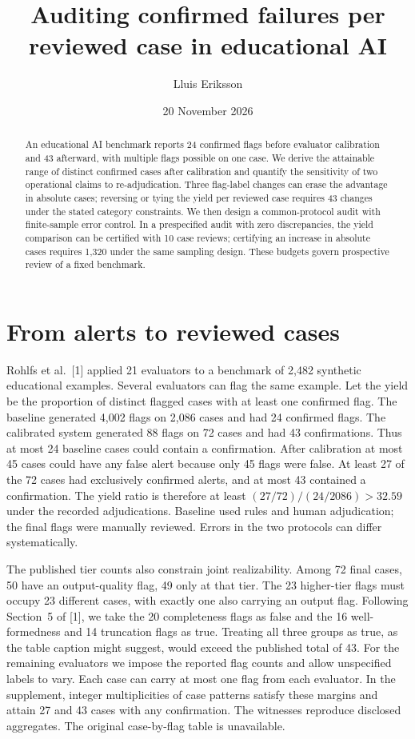 \documentclass[11pt]{article}
\title{Auditing confirmed failures per reviewed case in educational AI}
\author{Lluis Eriksson}\date{20 November 2026}
\begin{document}
\maketitle
\begin{abstract}
An educational AI benchmark reports 24 confirmed flags before evaluator calibration and 43 afterward, with multiple flags possible on one case. We derive the attainable range of distinct confirmed cases after calibration and quantify the sensitivity of two operational claims to re-adjudication. Three flag-label changes can erase the advantage in absolute cases; reversing or tying the yield per reviewed case requires 43 changes under the stated category constraints. We then design a common-protocol audit with finite-sample error control. In a prespecified audit with zero discrepancies, the yield comparison can be certified with 10 case reviews; certifying an increase in absolute cases requires 1,320 under the same sampling design. These budgets govern prospective review of a fixed benchmark.
\end{abstract}
\section{From alerts to reviewed cases}
Rohlfs et al.\ [1] applied 21 evaluators to a benchmark of 2,482 synthetic educational examples. Several evaluators can flag the same example. Let the yield be the proportion of distinct flagged cases with at least one confirmed flag. The baseline generated 4,002 flags on 2,086 cases and had 24 confirmed flags. The calibrated system generated 88 flags on 72 cases and had 43 confirmations. Thus at most 24 baseline cases could contain a confirmation. After calibration at most 45 cases could have any false alert because only 45 flags were false. At least 27 of the 72 cases had exclusively confirmed alerts, and at most 43 contained a confirmation. The yield ratio is therefore at least $(27/72)/(24/2086)>32.59$ under the recorded adjudications. Baseline used rules and human adjudication; the final flags were manually reviewed. Errors in the two protocols can differ systematically.

The published tier counts also constrain joint realizability. Among 72 final cases, 50 have an output-quality flag, 49 only at that tier. The 23 higher-tier flags must occupy 23 different cases, with exactly one also carrying an output flag. Following Section~5 of [1], we take the 20 completeness flags as false and the 16 well-formedness and 14 truncation flags as true. Treating all three groups as true, as the table caption might suggest, would exceed the published total of 43. For the remaining evaluators we impose the reported flag counts and allow unspecified labels to vary. Each case can carry at most one flag from each evaluator. In the supplement, integer multiplicities of case patterns satisfy these margins and attain 27 and 43 cases with any confirmation. The witnesses reproduce disclosed aggregates. The original case-by-flag table is unavailable.
\end{document}
